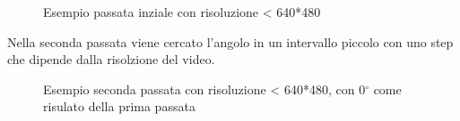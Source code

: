 \documentclass[12pt]{article}
\begin{document}
\begin{figure}[h!]
	\begin{center}
	  \caption{Esempio passata inziale con risoluzione < 640*480}
	\end{center}
\end{figure}

Nella seconda passata viene cercato l'angolo in un intervallo piccolo con uno step
che dipende dalla risolzione del video.

\begin{figure}[h!]
	\begin{center}
	  \caption{Esempio seconda passata con risoluzione < 640*480, con 0$^{\circ}$ come risulato della prima passata}
	\end{center}
\end{figure}
\end{document}
